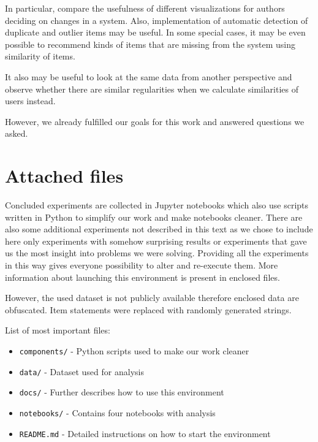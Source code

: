 \documentclass[
  printed, %
  table,   %
  nolof,     %
  nolot,     %
  color,
  final,
  nocover
]{fithesis3}
\begin{document}
In particular, compare the usefulness of different visualizations for authors deciding on changes in a system. Also, implementation of automatic detection of duplicate and outlier items may be useful. In some special cases, it may be even possible to recommend kinds of items that are missing from the system using similarity of items.

It also may be useful to look at the same data from another perspective and observe whether there are similar regularities when we calculate similarities of users instead.


However, we already fulfilled our goals for this work and answered questions we asked.


\makeatletter\thesis@blocks@clear\makeatother

\appendix %


\chapter{Attached files}

Concluded experiments are collected in Jupyter notebooks which also use scripts written in Python to simplify our work and make notebooks cleaner. There are also some additional experiments not described in this text as we chose to include here only experiments with somehow surprising results or experiments that gave us the most insight into problems we were solving. Providing all the experiments in this way gives everyone possibility to alter and re-execute them. More information about launching this environment is present in enclosed files.

However, the used dataset is not publicly available therefore enclosed data are obfuscated. Item statements were replaced with randomly generated strings.

List of most important files:

\begin{itemize}[\null]
\item \texttt{components/} - Python scripts used to make our work cleaner
\item \texttt{data/} - Dataset used for analysis
\item \texttt{docs/} - Further describes how to use this environment
\item \texttt{notebooks/} - Contains four notebooks with analysis
\item \texttt{README.md} - Detailed instructions on how to start the environment
\end{itemize}
\end{document}
